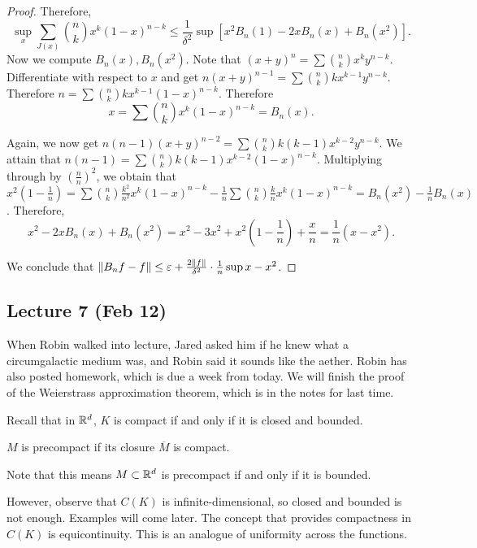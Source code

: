 \documentclass[10pt, twoside]{article}
\begin{document}
\begin{thm}
\begin{proof}
            Therefore, \[ \sup_x \sum_{J(x)} \binom{n}{k}x^k(1-x)^{n-k} \leq \frac{1}{\delta^2} \sup \left[ x^2 B_n(1) - 2x B_n(x) + B_n(x^2) \right]. \] Now we compute $B_n(x), B_n(x^2)$.
            Note that $(x+y)^n = \sum \binom{n}{k} x^k y^{n-k}$. Differentiate with respect to $x$ and get $n(x+y)^{n-1} = \sum \binom{n}{k}kx^{k-1}y^{n-k}$. Therefore $n = \sum \binom{n}{k}kx^{k-1}(1-x)^{n-k}$. Therefore \[x = \sum \binom{n}{k}x^k(1-x)^{n-k} = B_n(x).\]

            Again, we now get $n(n-1)(x+y)^{n-2} = \sum \binom{n}{k}k(k-1)x^{k-2}y^{n-k}$. We attain that $n(n-1) = \sum \binom{n}{k}k(k-1)x^{k-2}(1-x)^{n-k}$. Multiplying through by $\left(\frac{n}{n}\right)^2$, we obtain that $x^2\left(1-\frac{1}{n}\right) = \sum \binom{n}{k} \frac{k^2}{n^2}x^k(1-x)^{n-k} - \frac{1}{n}\sum \binom{n}{k}\frac{k}{n}x^k(1-x)^{n-k} = B_n(x^2) - \frac{1}{n}B_n(x)$. Therefore, \[x^2-2xB_n(x)+B_n(x^2) = x^2-3x^2 + x^2 \left(1 - \frac{1}{n}\right) + \frac{x}{n} = \frac{1}{n}(x-x^2).\]

            We conclude that $\lVert B_nf - f\rVert \leq \varepsilon + \frac{2 \lVert f\rVert}{\delta^2} \cdot \frac{1}{n} \sup{x-x^2}$.
        \end{proof} 
    \end{thm}

    \subsection*{Lecture 7 (Feb 12)}
    When Robin walked into lecture, Jared asked him if he knew what a circumgalactic medium was, and Robin said it sounds like the aether. Robin has also posted homework, which is due a week from today. We will finish the proof of the Weierstrass approximation theorem, which is in the notes for last time.

    Recall that in $\mathbb{R}^d$, $K$ is compact if and only if it is closed and bounded.

    \begin{defn}[Precompact]
        $M$ is precompact if its closure $\overline{M}$ is compact.
    \end{defn}

    Note that this means $M \subset \mathbb{R}^d$ is precompact if and only if it is bounded.

    However, observe that $C(K)$ is infinite-dimensional, so closed and bounded is not enough. Examples will come later. The concept that provides compactness in $C(K)$ is equicontinuity. This is an analogue of uniformity across the functions.
\end{document}
